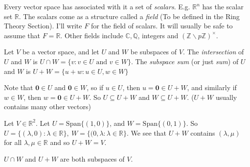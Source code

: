 \documentclass[10pt]{scrartcl}
\begin{document}
Every vector space has associated with it a set of \emph{scalars}. E.g. $\mathbb{R}^n$ has the scalar set $\mathbb{R}.$ The scalars come as a structure called a \emph{field} (To be defined in the Ring Theory Section). I'll write $F$ for the field of scalars. It will usually be safe to assume that $F = \mathbb{R}$. Other fields include $\mathbb{C}, \mathbb{Q}$, integers and $(\mathbb{Z}\backslash p \mathbb{Z})^{\times}$.

\vspace*{5pt}

\begin{definition} Let $V$ be a vector space, and let $U$ and $W$ be subspaces of $V$. The \emph{intersection} of $U$ and $W$ is $U \cap W = \{v: v \in U \text{ and } v \in W\}$. The \emph{subspace sum} (or just \emph{sum}) of $U$ and $W$ is $U + W = \{u + w: u \in U, w \in W\}$
\end{definition}\vspace*{5pt}

\begin{remark}  Note that $\mathbf{0} \in U$ and $\mathbf{0} \in W$, so if $u \in U$, then $u = \mathbf{0} \in U + W$, and similarly if  $w \in W$, then $w = \mathbf{0} \in U + W$. So $U \subseteq U + W$ and $W \subseteq U + W$. ($U+W$ usually contains many other vectors)
\end{remark}\vspace*{10pt}

\begin{example} Let $V \in \mathbb{R}^2.$ Let $U = \text{Span}\{(1,0)\}$, and  $W = \text{Span}\{(0,1)\}$. So $U = \{(\lambda, 0): \lambda \in \mathbb{R}\}, ~W = \{(0,\lambda: \lambda \in \mathbb{R}\}$. We see that $U + W$ contains $(\lambda, \mu)$ for all $\lambda, \mu \in \mathbb{R}$ and so $U + W = V$.
\end{example}\vspace*{5pt}



\begin{proposition} $U \cap W$ and $U + W$ are both subspaces of $V$. 	
\end{proposition}
\end{document}
